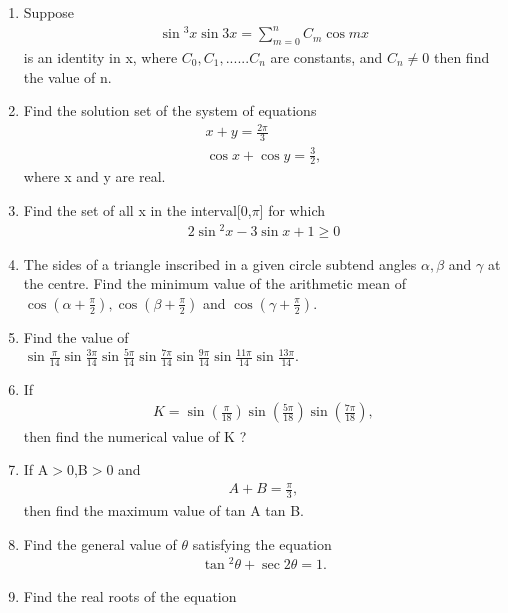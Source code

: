 \renewcommand{\theequation}{\theenumi}
\begin{enumerate}[label=\arabic*.,ref=\thesubsection.\theenumi]

 \item Suppose 
    \begin{align}
    \sin{^3x} \sin{3x} = \sum_{m=0}^{n} C_m\cos{mx}
    \end{align} is an identity in x, where $C_0 , C_1 ,......C_n$ are constants, and $C_n\neq0$ then find the value of n.
    \item Find the solution set of the system of equations 
    \begin{align}
    x + y =\frac{2\pi}{3}\\
    \cos{x} + \cos{y} = \frac{3}{2},
    \end{align} where x and y are real.
    \item Find the set of all x in the interval[0,$\pi$] for which \begin{align}
        2\sin{^2x}-3\sin{x} + 1\geq 0
    \end{align}
    \item The sides of a triangle inscribed in a given circle subtend angles $\alpha,\beta$ and $\gamma$ at the centre. Find the minimum value of the arithmetic mean of $\cos{(\alpha + \frac{\pi}{2})}, \cos{(\beta + \frac{\pi}{2})}$ and $\cos{(\gamma + \frac{\pi}{2})}.$
    \item Find the value of \\
    $\sin{\frac{\pi}{14}}\sin{\frac{3\pi}{14}}\sin{\frac{5\pi}{14}}\sin{\frac{7\pi}{14}}\sin{\frac{9\pi}{14}}\sin{\frac{11\pi}{14}}\sin{\frac{13\pi}{14}}.$
    \item If 
    \begin{align}
    K =\sin{(\frac{\pi}{18})}\sin{(\frac{5\pi}{18})}\sin{(\frac{7\pi}{18})},
    \end{align} 
    then find the numerical value of K ?
    \item If A$>$0,B$>$0 and 
    \begin{align}
    A + B = \frac{\pi}{3},
    \end{align}
    then find the maximum value of tan A tan B.
    \item Find the general value of $\theta$ satisfying the equation 
    \begin{align}
    \tan{^2\theta}  + \sec{2\theta} = 1. 
    \end{align}
    \item Find the real roots of the equation 

\end{enumerate}
